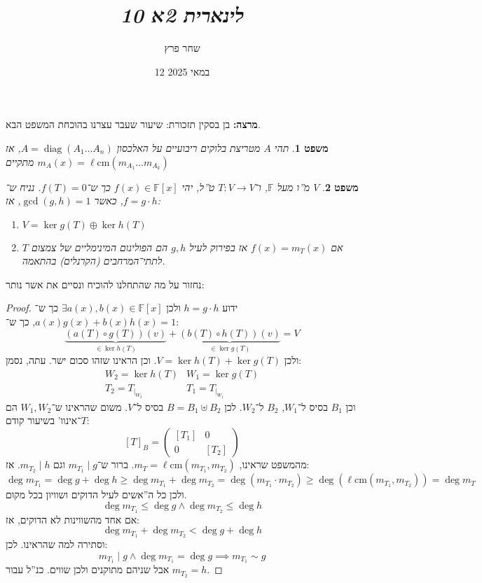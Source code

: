 \documentclass[]{article}
\author{שחר פרץ}
\title{\textit{לינארית 2א 10}}
\date{12 במאי 2025}
\DeclareMathOperator{\diag}    {diag}
\newcommand\lcm                {\ell\mathrm{cm}}
\newcommand\F         {\mathbb{F}}
\newcommand\co        {\colon}
\newcommand\pms[1]    {\begin{pmatrix}
        #1
\end{pmatrix}}
\newtheorem{Theorem}{משפט}
\theoremstyle{definition}
\newcommand\theo  [1] {\begin{Theorem}#1\end{Theorem}}
\begin{document}
    \maketitle
    \textbf{מרצה: }בן בסקין
    תזכורת: שיעור שעבר עצרנו בהוכחת המשפט הבא. 
    
    \theo{תהי $A$ מטריצת בלוקים ריבועיים על האלכסון $A = \diag(A_1 \dots A_n)$, אז מתקיים $m_A(x) = \lcm(m_{A_1} \dots m_{A_k})$}
    
    \theo{$V$ מ''ו מעל $\F$, ו־$T \co V \to V$ ט''ל, יהי $f(x) \in \F[x]$ כך ש־$f(T) = 0$. נניח ש־$f = g \cdot h$, כאשר $\gcd(g, h) = 1$, אז: 
    \begin{enumerate}
        \item \hfil $V = \ker g(T) \oplus \ker h(T)$
        \item אם $f(x) = m_T(x)$ אז בפירוק לעיל $g, h$ הם הפולינום המינימליים של צמצום $T$ לתתי־המרחבים (הקרנלים) בהתאמה. 
    \end{enumerate}
    }
    
    נחזור על מה שהתחלנו להוכיח ונסיים את אשר נותר: 
    \begin{proof}
        ידוע $h= g \cdot h$ ולכן $\exists a(x), b(x) \in \F[x]$ כך ש־$a(x)g(x) + b(x)h(x) = 1$, כך ש־: 
        \[ \underbrace{(a(T) \circ g(T))(v)}_{\in \ker h(T)} + \underbrace{(b(T) \circ h(T))(v)}_{\in \ker g(T)} = V \]
        ולכן $V = \ker h(T) + \ker g(T)$. 
        וכן הראינו שזהו סכום ישר. עתה, נסמן: 
        \begin{align*}
            W_2 = \ker h(T) & W_1 = \ker g(T) \\
            T_2 =  T_{|_{W_2}} & T_1 = T_{|_{W_1}}
        \end{align*}
        וכן $B_1$ בסיס ל־$W_1$, $B_2$ ל־$W_2$. לכן $B = B_1 \uplus B_2$ בסיס ל־$V$. משום שהראינו ש־$W_1, W_2$ הם $T$־אינוו' בשיעור קודם: 
        \[ [T]_B = \pms{[T_1] & 0 \\ 0 & [T_2]} \]
        מהמשפט שראינו, $m_T = \lcm(m_{T_1}, m_{T_2})$. ברור ש־$m_{T_1} \mid g$ וגם $m_{T_2} \mid h$. אז: 
        \[ \deg m_{T_1} = \deg g + \deg h \ge \deg m_{T_1} + \deg m_{T_2} = \deg(m_{T_1} \cdot m_{T_2}) \ge \deg(\lcm(m_{T_1}, m_{T_2})) = \deg m_T \]
        ולכן כל ה''אשים לעיל הדוקים ושוויון בכל מקום. 
        \[ \deg m_{T_1} \le \deg g \land \deg m_{T_2} \le \deg h \]
        אם אחד מהשווינות לא הדוקים, אז: 
        \[ \deg m_{T_1} + \deg m_{T_2} < \deg g + \deg h \]
        וסתירה למה שהראינו. לכן: 
        \[ m_{T_1} \mid g \land \deg m_{T_1} = \deg g \implies m_{T_1} \sim g \]
        אבל שניהם מתוקנים ולכן שווים. כנ''ל עבור $m_{T_2} = h$. 
    \end{proof}
    
\end{document}
